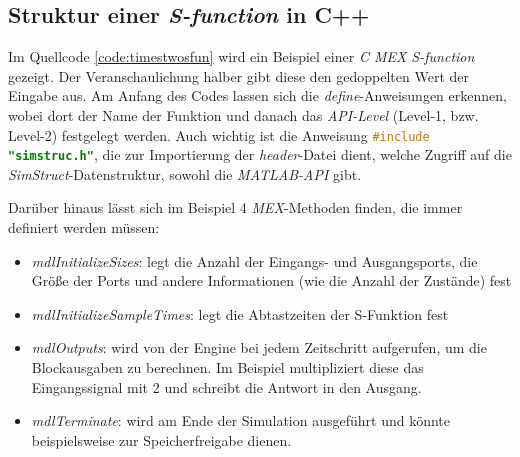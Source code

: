 \subsection{Struktur einer \textit{S-function} in C++}
Im Quellcode \ref{code:timestwosfun} wird ein Beispiel einer \textit{C MEX S-function} gezeigt. Der Veranschaulichung halber gibt diese den gedoppelten Wert der Eingabe aus. Am Anfang des Codes lassen sich die \textit{define}-Anweisungen erkennen, wobei dort der Name der Funktion und danach das \textit{API-Level} (Level-1, bzw. Level-2) festgelegt werden. Auch wichtig ist die Anweisung \lstinline[language=C,basicstyle=\ttfamily\footnotesize]{#include "simstruc.h"}, die zur Importierung der \textit{header}-Datei dient, welche Zugriff auf die \textit{SimStruct}-Datenstruktur, sowohl die \textit{MATLAB-API} gibt.

Darüber hinaus lässt sich im Beispiel 4 \textit{MEX}-Methoden finden, die immer definiert werden müssen:
\begin{itemize}
    \item \textit{mdlInitializeSizes}: legt die Anzahl der Eingangs- und Ausgangsports, die Größe der Ports und andere Informationen (wie die Anzahl der Zustände) fest
    \item \textit{mdlInitializeSampleTimes}: legt die Abtastzeiten der S-Funktion fest
    \item \textit{mdlOutputs}: wird von der Engine bei jedem Zeitschritt aufgerufen, um die Blockausgaben zu berechnen. Im Beispiel multipliziert diese das Eingangssignal mit 2 und schreibt die Antwort in den Ausgang.
    \item \textit{mdlTerminate}: wird am Ende der Simulation ausgeführt und könnte beispielsweise zur Speicherfreigabe dienen. \cite{CreateBasicMEX}
\end{itemize}


